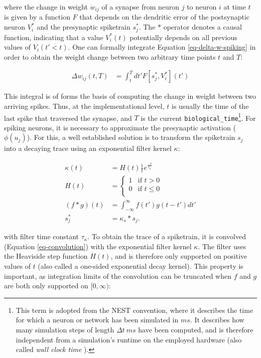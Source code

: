 where the change in weight $\dot{w}_{ij}$ of a synapse from neuron $j$ to neuron $i$ at time $t$ is given by a function
$F$ that depends on the dendritic error of the postsynaptic neuron $V_i^\ast$ and the presynaptic spiketrain $s_j^\ast$.
The $\ast$ operator denotes a causal function, indicating that a value $V_i^\ast(t)$ potentially depends on all previous
values of $V_i(t' < t)$. One can formally integrate Equation \ref{eq-delta-w-spiking} in order to obtain the weight
change between two arbitrary time points $t$ and $T$:

\begin{align}
  \Delta w_{ij}(t,T) & = \int_t^T dt' F[s_j^\ast, V_i^\ast](t') \label{eq-delta-w-t-T}
\end{align}

This integral is of forms the basis of computing the change in weight between two arriving spikes. Thus, at the
implementational level, $t$ is usually the time of the last spike that traversed the synapse, and $T$ is the current
\texttt{biological\_time}\footnote{This term is adopted from the NEST convention, where it describes the time for which
a neuron or network has been simulated in $ms$. It describes how many simulation steps of length $\Delta t \ ms$ have
been computed, and is therefore independent from a simulation's runtime  on the employed hardware (also called
\textit{wall clock time} \citep{albada2018performance}). }. For spiking neurons, it is necessary to approximate the
presynaptic activation ($\phi(u_j)$). For this, a well established solution is to transform the spiketrain $s_j$ into a
decaying trace using an exponential filter kernel $\kappa$:

\begin{align}
  \kappa(t)     & = H(t) \frac{1}{t}e^{\frac{-t}{\tau_{\kappa}}}                        \\
  H(t)          & =
  \begin{cases}
    1 & \text{if $t > 0$}    \\
    0 & \text{if $t \leq 0$} \\
  \end{cases}                                                              \\
  (f \ast g)(t) & = \int_{- \infty }^{\infty} f(t') g(t-t') d t' \label{eq-convolution} \\
  s_j^\ast      & = \kappa_s \ast s_j. \label{eq-spike-trace}
\end{align}

with filter time constant $\tau_\kappa$. To obtain the trace of a spiketrain, it is convolved (Equation
\ref{eq-convolution}) with the exponential filter kernel $\kappa$. The filter uses the Heaviside step function $H(t)$,
and is therefore only supported on positive values of $t$ (also called a one-sided exponential decay kernel). This
property is important, as integration limits of the convolution can be truncated when $f$ and $g$ are both only
supported on $[0,\infty)$:

